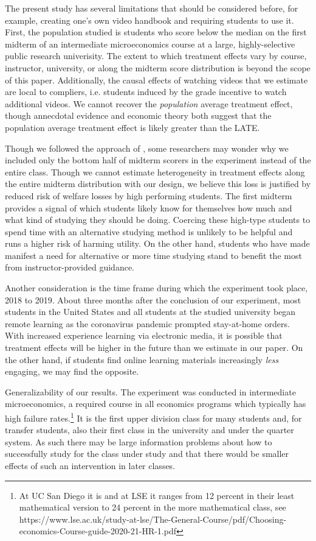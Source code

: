 \documentclass[12pt]{article}
\begin{document}
The present study has several limitations that should be considered before, for example, creating one's own video handbook and requiring students to use it. First, the population studied is students who score below the median on the first midterm of an intermediate microeconomics course at a large, highly-selective public research univerisity. The extent to which treatment effects vary by course, instructor, university, or along the midterm score distribution is beyond the scope of this paper. Additionally, the causal effects of watching videos that we estimate are local to compliers, i.e. students induced by the grade incentive to watch additional videos. We cannot recover the \textit{population} average treatment effect, though annecdotal evidence and economic theory both suggest that the population average treatment effect is likely greater than the LATE.%

Though we followed the approach of \textcite{dgm2010}, some researchers may wonder why we included only the bottom half of midterm scorers in the experiment instead of the entire class.  Though we cannot estimate heterogeneity in treatment effects along the entire midterm distribution with our design, we believe this loss is justified by reduced risk of welfare losses by high performing students. The first midterm provides a signal of which students likely know for themselves how much and what kind of studying they should be doing. Coercing these high-type students to spend time with an alternative studying method is unlikely to be helpful and runs a higher risk of harming utility. On the other hand, students who have made manifest a need for alternative or more time studying stand to benefit the most from instructor-provided guidance.

Another consideration is the time frame during which the experiment took place, 2018 to 2019. About three months after the conclusion of our experiment, most students in the United States and all students at the studied university began remote learning as the coronavirus pandemic prompted stay-at-home orders. With increased experience learning via electronic media, it is possible that treatment effects will be higher in the future than we estimate in our paper. On the other hand, if students find online learning materials increasingly \textit{less} engaging, we may find the opposite.

Generalizability of our results. The experiment was conducted in intermediate microeconomics, a required course in all economics programs which typically has high failure rates.\footnote{At UC San Diego it is and at LSE it ranges from 12 percent in their least mathematical version to 24 percent in the more mathematical class, see https://www.lse.ac.uk/study-at-lse/The-General-Course/pdf/Choosing-economics-Course-guide-2020-21-HR-1.pdf} It is the first upper division class for many students and, for transfer students, also their first class in the university and under the quarter system. As such there may be large information problems about how to successfully study for the class under study and that there would be smaller effects of such an intervention in later classes.
\end{document}
